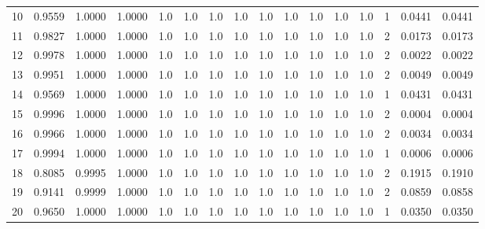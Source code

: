 \begin{tabular}{lrrrrrrrrrrrrrrr}
10  &      0.9559 &  1.0000 &  1.0000 &     1.0 &     1.0 &     1.0 &     1.0 &     1.0 &     1.0 &     1.0 &      1.0 &        1.0 &      1 &                    0.0441 &                     0.0441 \\
11  &      0.9827 &  1.0000 &  1.0000 &     1.0 &     1.0 &     1.0 &     1.0 &     1.0 &     1.0 &     1.0 &      1.0 &        1.0 &      2 &                    0.0173 &                     0.0173 \\
12  &      0.9978 &  1.0000 &  1.0000 &     1.0 &     1.0 &     1.0 &     1.0 &     1.0 &     1.0 &     1.0 &      1.0 &        1.0 &      2 &                    0.0022 &                     0.0022 \\
13  &      0.9951 &  1.0000 &  1.0000 &     1.0 &     1.0 &     1.0 &     1.0 &     1.0 &     1.0 &     1.0 &      1.0 &        1.0 &      2 &                    0.0049 &                     0.0049 \\
14  &      0.9569 &  1.0000 &  1.0000 &     1.0 &     1.0 &     1.0 &     1.0 &     1.0 &     1.0 &     1.0 &      1.0 &        1.0 &      1 &                    0.0431 &                     0.0431 \\
15  &      0.9996 &  1.0000 &  1.0000 &     1.0 &     1.0 &     1.0 &     1.0 &     1.0 &     1.0 &     1.0 &      1.0 &        1.0 &      2 &                    0.0004 &                     0.0004 \\
16  &      0.9966 &  1.0000 &  1.0000 &     1.0 &     1.0 &     1.0 &     1.0 &     1.0 &     1.0 &     1.0 &      1.0 &        1.0 &      2 &                    0.0034 &                     0.0034 \\
17  &      0.9994 &  1.0000 &  1.0000 &     1.0 &     1.0 &     1.0 &     1.0 &     1.0 &     1.0 &     1.0 &      1.0 &        1.0 &      1 &                    0.0006 &                     0.0006 \\
18  &      0.8085 &  0.9995 &  1.0000 &     1.0 &     1.0 &     1.0 &     1.0 &     1.0 &     1.0 &     1.0 &      1.0 &        1.0 &      2 &                    0.1915 &                     0.1910 \\
19  &      0.9141 &  0.9999 &  1.0000 &     1.0 &     1.0 &     1.0 &     1.0 &     1.0 &     1.0 &     1.0 &      1.0 &        1.0 &      2 &                    0.0859 &                     0.0858 \\
20  &      0.9650 &  1.0000 &  1.0000 &     1.0 &     1.0 &     1.0 &     1.0 &     1.0 &     1.0 &     1.0 &      1.0 &        1.0 &      1 &                    0.0350 &                     0.0350 \\

\end{tabular}
